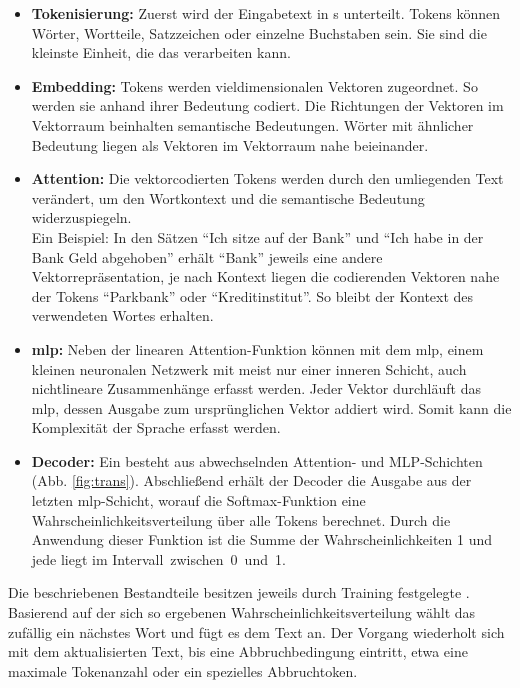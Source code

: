 \documentclass[../main.tex]{subfiles}
\begin{document}
\begin{itemize}

\item \textbf{Tokenisierung:} Zuerst wird der Eingabetext in s unterteilt. Tokens können Wörter, Wortteile, Satzzeichen oder einzelne Buchstaben sein. Sie sind die kleinste Einheit, 
die das  verarbeiten kann. \cite{architecture}

\item \textbf{Embedding:} Tokens werden vieldimensionalen Vektoren zugeordnet. So werden sie anhand ihrer Bedeutung codiert. Die Richtungen der Vektoren im
Vektorraum beinhalten semantische Bedeutungen. Wörter mit ähnlicher Bedeutung liegen als Vektoren im Vektorraum nahe beieinander. \cite{embedding}

\item \textbf{Attention:} Die vektorcodierten Tokens werden durch den umliegenden Text verändert, um den Wortkontext und die semantische Bedeutung widerzuspiegeln.\\
Ein Beispiel: In den Sätzen "`Ich sitze auf der Bank"' und "`Ich habe in der Bank Geld abgehoben"' erhält "`Bank"' jeweils eine andere Vektorrepräsentation, je nach Kontext liegen die codierenden 
Vektoren nahe der Tokens "`Parkbank"' oder "`Kreditinstitut"'. So bleibt der Kontext des verwendeten Wortes erhalten. \cite{attention, attention2} 

\item \textbf{\acrfull{mlp}:} Neben der linearen Attention-Funktion können mit dem \acrshort{mlp}, einem kleinen neuronalen Netzwerk mit meist nur einer inneren Schicht, auch nichtlineare Zusammenhänge 
erfasst werden. Jeder Vektor durchläuft das \acrshort{mlp}, dessen Ausgabe zum ursprünglichen Vektor addiert wird. Somit kann die Komplexität der Sprache erfasst werden. \cite{mlp}

\item \textbf{Decoder:} Ein  besteht aus abwechselnden Attention- und MLP-Schichten (Abb. \ref{fig:trans}). Abschließend erhält der Decoder die Ausgabe aus der letzten 
\acrshort{mlp}-Schicht, worauf die Softmax-Funktion eine Wahrscheinlichkeitsverteilung über alle Tokens berechnet. Durch die Anwendung dieser Funktion ist die Summe der Wahrscheinlichkeiten 1 und jede liegt im \mbox{Intervall zwischen 0 und 1.\cite{architecture}}
\end{itemize}

Die beschriebenen Bestandteile besitzen jeweils durch Training festgelegte . Basierend auf der sich so ergebenen Wahrscheinlichkeitsverteilung wählt das  zufällig ein nächstes Wort und fügt es dem Text an. Der Vorgang wiederholt sich mit dem aktualisierten Text, 
bis eine Abbruchbedingung eintritt, etwa eine maximale Tokenanzahl oder ein spezielles Abbruchtoken. \cite{architecture}\\
\end{document}
